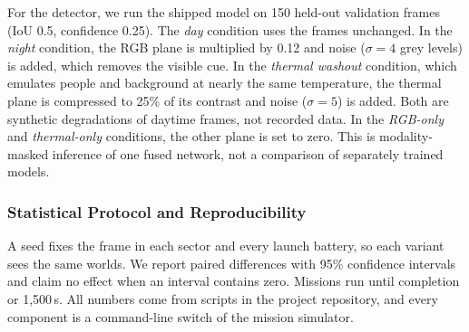 \documentclass[10pt,a4paper,twocolumn]{article}
\begin{document}
For the detector, we run the shipped model on 150 held-out validation frames (IoU 0.5, confidence 0.25). The \emph{day} condition uses the frames unchanged. In the \emph{night} condition, the RGB plane is multiplied by 0.12 and noise ($\sigma=4$ grey levels) is added, which removes the visible cue. In the \emph{thermal washout} condition, which emulates people and background at nearly the same temperature, the thermal plane is compressed to 25\% of its contrast and noise ($\sigma=5$) is added. Both are synthetic degradations of daytime frames, not recorded data. In the \emph{RGB-only} and \emph{thermal-only} conditions, the other plane is set to zero. This is modality-masked inference of one fused network, not a comparison of separately trained models.

\subsubsection{Statistical Protocol and Reproducibility}
A seed fixes the frame in each sector and every launch battery, so each variant sees the same worlds. We report paired differences with 95\% confidence intervals and claim no effect when an interval contains zero. Missions run until completion or 1{,}500\,s. All numbers come from scripts in the project repository, and every component is a command-line switch of the mission simulator.

\end{document}
